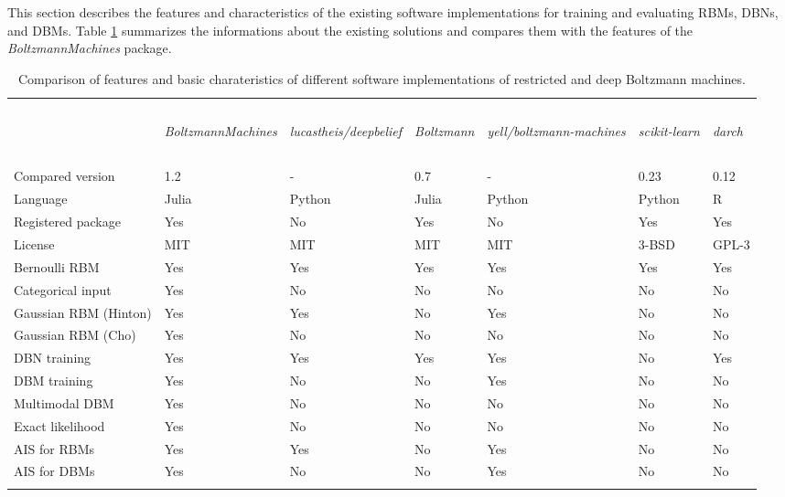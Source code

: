 \documentclass[12pt]{article}
\newcommand{\apkg}[1]{\emph{#1}}
\begin{document}
This section describes the features and characteristics of the existing software implementations for training and evaluating RBMs, DBNs, and DBMs.
Table \ref{tab:FeatureOverviewBoltzmann} summarizes the informations about the existing solutions and compares them with the features of the \apkg{BoltzmannMachines} package.

\begin{table}[h!]
\centering
\caption{\label{tab:FeatureOverviewBoltzmann} Comparison of features and basic charateristics of different software implementations of restricted and deep Boltzmann machines.}
\begin{tabular}{p{4.4cm} p{1.1cm} p{1.1cm} p{1.1cm} p{1.1cm} p{1.25cm} p{1.25cm}}
\hline \\ [3.9ex]\\
 & \begin{rotate}{25}\apkg{BoltzmannMachines} \end{rotate} &
 \begin{rotate}{25} \apkg{lucastheis/deepbelief} \end{rotate} &
 \begin{rotate}{25} \apkg{Boltzmann} \end{rotate} &
 \begin{rotate}{25} \apkg{yell/boltzmann-machines}  \end{rotate} &
 \begin{rotate}{25} \apkg{scikit-learn} \end{rotate} &
 \begin{rotate}{25} \apkg{darch} \end{rotate} \\
\hline
\\\\[-4\medskipamount]
Compared version & 1.2 & - & 0.7 & - & 0.23 & 0.12 \\
Language & Julia & Python & Julia & Python & Python & R \\
Registered package & Yes & No & Yes & No & Yes & Yes \\
License & MIT & MIT & MIT & MIT & 3-BSD & GPL-3 \\
Bernoulli RBM & Yes & Yes & Yes  & Yes & Yes & Yes \\
Categorical input & Yes & No & No & No & No & No \\
Gaussian RBM (Hinton) & Yes & Yes & No & Yes & No & No \\
Gaussian RBM (Cho) & Yes & No & No & No & No & No \\
DBN training & Yes & Yes & Yes & Yes & No & Yes \\
DBM training & Yes & No & No & Yes & No & No \\
Multimodal DBM & Yes & No & No & No & No & No \\
Exact likelihood & Yes & No & No & No & No & No \\
AIS for RBMs & Yes & Yes & No & Yes & No & No \\
AIS for DBMs & Yes & No & No & Yes & No & No \\
\\[-2\medskipamount]
\hline
\end{tabular}
\end{table}
\end{document}
